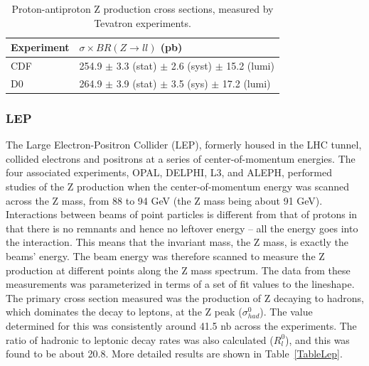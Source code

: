 \begin{table}[htbp]
  \begin{center}
    \caption{Proton-antiproton Z production cross sections, measured by Tevatron experiments.}
    \label{TableTevatron}
    \begin{tabular}[]{ | l | l | }
      \hline
      Experiment & $\sigma \times BR(Z \rightarrow ll)$ (pb) \\ \hline \hline
      CDF & 254.9 $\pm$ 3.3 (stat) $\pm$ 2.6 (syst) $\pm$ 15.2 (lumi) \\ \hline
      D0 & 264.9 $\pm$ 3.9 (stat) $\pm$ 3.5 (sys) $\pm$ 17.2 (lumi) \\ \hline
    \end{tabular}
  \end{center}
\end{table}



\subsubsection{LEP}

The Large Electron-Positron Collider (LEP), 
formerly housed in the LHC tunnel, 
collided electrons and positrons at a 
series of center-of-momentum energies.  
The four associated experiments, 
OPAL, DELPHI, L3, and ALEPH, performed studies of 
the Z production 
when the center-of-momentum energy 
was scanned across the Z mass, 
from 88 to 94 GeV (the Z mass being about 91 GeV).  
Interactions between beams of point particles 
is different from that of protons in that there is no 
remnants and hence no leftover energy -- 
all the energy goes into the interaction.  
This means that the invariant mass, 
the Z mass, is exactly the beams' energy.  
The beam energy was therefore scanned 
to measure the Z production at different 
points along the Z mass spectrum.  
The data from these measurements was parameterized 
in terms of a set of fit values to the lineshape.  
The primary cross section measured was the production 
of Z decaying to hadrons, which dominates the decay 
to leptons, at the Z peak ($\sigma_{had}^0$).  
The value determined for this was consistently 
around 41.5 nb across the experiments.  
The ratio of hadronic to leptonic decay rates 
was also calculated ($R_l^0$), 
and this was found to be about 20.8.  
More detailed results 
are shown in Table~\ref{TableLep}.  


